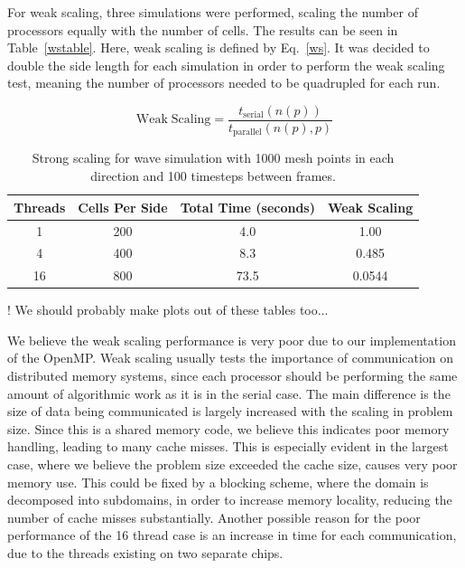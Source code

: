 \documentclass[12pt]{article}
\begin{document}
For weak scaling, three simulations were performed, scaling the number of processors equally with the number of cells. The results can be seen in Table~\ref{wstable}. Here, weak scaling is defined by Eq.~\ref{ws}. It was decided to double the side length for each simulation in order to perform the weak scaling test, meaning the number of processors needed to be quadrupled for each run.

\begin{equation}
\mathrm{Weak \; Scaling} = \frac{t_{\mathrm{serial}}(n(p))}{t_{\mathrm{parallel}}(n(p),p)}
\label{ws}
\end{equation}

\begin{table}[h]
	\begin{center}
		\begin{tabular}{|c c c c|}
			\hline
			Threads & Cells Per Side & Total Time (seconds) & Weak Scaling \\ \hline
			1 & 200 & 4.0 & 1.00   \\ \hline
			4 & 400 & 8.3 & 0.485 \\ \hline
			16 & 800 & 73.5 & 0.0544   \\ \hline
		\end{tabular}
		\caption{Strong scaling for wave simulation with 1000 mesh points in each direction and 100 timesteps between frames.}
		\label{sstable}
	\end{center}
\end{table}

! We should probably make plots out of these tables too...

We believe the weak scaling performance is very poor due to our implementation of the OpenMP. Weak scaling usually tests the importance of communication on distributed memory systems, since each processor should be performing the same amount of algorithmic work as it is in the serial case. The main difference is the size of data being communicated is largely increased with the scaling in problem size. Since this is a shared memory code, we believe this indicates poor memory handling, leading to many cache misses. This is especially evident in the largest case, where we believe the problem size exceeded the cache size, causes very poor memory use. This could be fixed by a blocking scheme, where the domain is decomposed into subdomains, in order to increase memory locality, reducing the number of cache misses substantially. Another possible reason for the poor performance of the 16 thread case is an increase in time for each communication, due to the threads existing on two separate chips.
\end{document}

